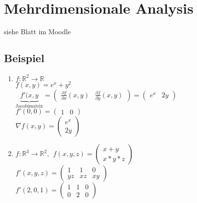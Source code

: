  
\section{Mehrdimensionale Analysis}
siehe Blatt im Moodle


\setcounter{subsection}{12}
\subsection{Beispiel}
\begin{enumerate}
	\item
	$f:\mathbb{R}^2\rightarrow\mathbb{R}$\\
	$f(x,y)=e^x+y^2$\\
	$\underbrace{f'(x,y}_{\text{Jacobimatrix}}=\begin{pmatrix}\frac{\partial f}{\partial x}(x,y) & \frac{\partial f}{\partial y}(x,y)\end{pmatrix}= \begin{pmatrix}e^x & 2y\end{pmatrix}$\\
	$f'(0,0)=\begin{pmatrix}1 & 0\end{pmatrix}$\\
	$\nabla f(x,y)=\begin{pmatrix}e^x \\ 2y\end{pmatrix}$
	
	\item
	$f:\mathbb{R}^3\rightarrow \mathbb{R}^2, \ \ f(x,y,z)=\begin{pmatrix}x+y \\ x*y*z\end{pmatrix}$\\
	$f'(x,y,z)=\begin{pmatrix}1 & 1 & 0 \\ yz & xz & xy\end{pmatrix}$\\
	$f'(2,0,1)=\begin{pmatrix}1 & 1 & 0 \\ 0 &  2 & 0 \end{pmatrix}$
\end{enumerate}

\setcounter{subsection}{21}

